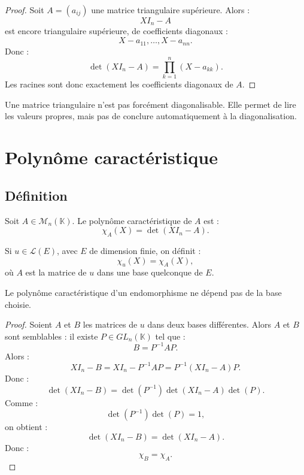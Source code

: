 \documentclass[11pt,a4paper]{article}
\newcommand{\K}{\mathbb K}
\newcommand{\M}{\mathcal M}
\newcommand{\Lcal}{\mathcal L}
\begin{document}
\begin{proof}
Soit \(A=(a_{ij})\) une matrice triangulaire supérieure.  
Alors :
\[
XI_n-A
\]
est encore triangulaire supérieure, de coefficients diagonaux :
\[
X-a_{11},\dots,X-a_{nn}.
\]
Donc :
\[
\det(XI_n-A)=\prod_{k=1}^n (X-a_{kk}).
\]
Les racines sont donc exactement les coefficients diagonaux de \(A\).
\end{proof}

\begin{erreurbox}
Une matrice triangulaire n'est pas forcément diagonalisable.  
Elle permet de lire les valeurs propres, mais pas de conclure automatiquement à la diagonalisation.
\end{erreurbox}

\section{Polynôme caractéristique}

\subsection{Définition}

\begin{definitionbox}
Soit \(A\in\M_n(\K)\).  
Le polynôme caractéristique de \(A\) est :
\[
\chi_A(X)=\det(XI_n-A).
\]
\end{definitionbox}

\begin{definitionbox}
Si \(u\in\Lcal(E)\), avec \(E\) de dimension finie, on définit :
\[
\chi_u(X)=\chi_A(X),
\]
où \(A\) est la matrice de \(u\) dans une base quelconque de \(E\).
\end{definitionbox}

\begin{theorembox}
Le polynôme caractéristique d'un endomorphisme ne dépend pas de la base choisie.
\end{theorembox}

\begin{proof}
Soient \(A\) et \(B\) les matrices de \(u\) dans deux bases différentes.  
Alors \(A\) et \(B\) sont semblables : il existe \(P\in GL_n(\K)\) tel que :
\[
B=P^{-1}AP.
\]
Alors :
\[
XI_n-B
=
XI_n-P^{-1}AP
=
P^{-1}(XI_n-A)P.
\]
Donc :
\[
\det(XI_n-B)
=
\det(P^{-1})\det(XI_n-A)\det(P).
\]
Comme :
\[
\det(P^{-1})\det(P)=1,
\]
on obtient :
\[
\det(XI_n-B)=\det(XI_n-A).
\]
Donc :
\[
\chi_B=\chi_A.
\]
\end{proof}
\end{document}
